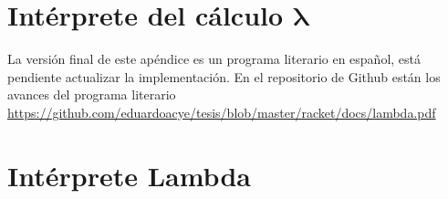 \documentclass[letterpaper,twoside,openright,11pt]{book}
\newcommand{\bs}{\boldsymbol}
\theoremstyle{indented}
\begin{document}
\chapter{\texorpdfstring{Intérprete del cálculo \( \bs{λ} \)}{Intérprete del cálculo lambda}}
\label{ap:texlambda}
\begin{Eduardo}
La versión final de este apéndice es un programa literario en español, está pendiente actualizar la implementación. En el repositorio de Github están los avances del programa literario
\url{https://github.com/eduardoacye/tesis/blob/master/racket/docs/lambda.pdf}
\end{Eduardo}


\chapter{Intérprete Lambda}
\label{ap:lambda}


\nocite{*}


\end{document}
